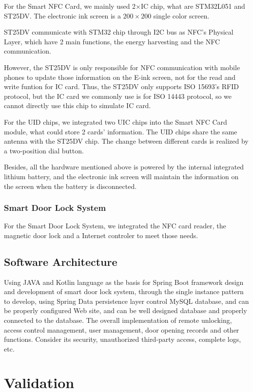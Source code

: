 \documentclass[11pt, a4paper]{article}
\begin{document}
For the Smart NFC Card, we mainly used 2$\times$IC chip, what are STM32L051 and ST25DV. The electronic ink screen is a $200 \times 200$ single color screen.

ST25DV communicate with STM32 chip through I2C bus as NFC's Physical Layer, which have 2 main functions, the energy harvesting and the NFC communication.

However, the ST25DV is only responsible for NFC communication with mobile phones to update those information on the E-ink screen, not for the read and write funtion for IC card. Thus, the ST25DV only supports ISO 15693's RFID protocol, but the IC card we commonly use is for ISO 14443 protocol, so we cannot directly use this chip to simulate IC card.

For the UID chips, we integrated two UIC chips into the Smart NFC Card module, what could store 2 cards' information. The UID chips share the same antenna with the ST25DV chip. The change between different cards is realized by a two-position dial button.

Besides, all the hardware mentioned above is powered by the internal integrated lithium battery, and the electronic ink screen will maintain the information on the screen when the battery is disconnected.

\subsubsection{Smart Door Lock System}

For the Smart Door Lock System, we integrated the NFC card reader, the magnetic door lock and a Internet controler to meet those needs.


\subsection{Software Architecture}
Using JAVA and Kotlin language as the basis for Spring Boot framework design and development of smart door lock system, through the single instance pattern to develop, using Spring Data persistence layer control MySQL database, and can be properly configured Web site, and can be well designed database and properly connected to the database.  The overall implementation of remote unlocking, access control management, user management, door opening records and other functions.  Consider its security, unauthorized third-party access, complete logs, etc.

\section{Validation}
\end{document}
